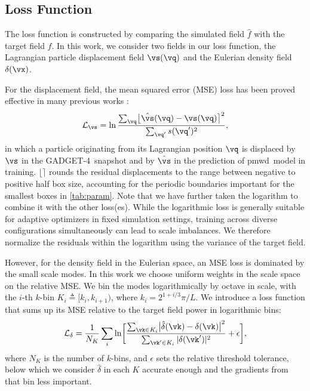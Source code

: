 \documentclass[modern, trackchanges, dvipsnames]{aastex631}
\newcommand{\pmwd}{{\usefont{T1}{nova}{m}{sl}pmwd}}
\newcommand{\GADGET}{{{\fontsize{10pt}{12pt}\selectfont GADGET}-4}}
\newcommand{\cL}{\mathcal{L}}
\begin{document}
\vspace{1em}
\subsection{Loss Function}
\label{sec:loss}

The loss function is constructed by comparing the simulated field $\hat
f$ with the target field $f$.
In this work, we consider two fields in our loss function, the
Lagrangian particle displacement field $\vs(\vq)$ and the Eulerian
density field $\delta(\vx)$.

For the displacement field, the mean squared error (MSE) loss has been
proved effective in many previous works
\citep[e.g.,][]{HeEtAl2019, LiEtAl2021}:
%
\begin{equation}
\cL_\vs = \ln \frac{\sum_\vq \bigl\lfloor \hat\vs(\vq) - \vs(\vq) \bigr\rceil^2}
                   {\sum_{\vq'} s(\vq')^2},
\end{equation}
%
in which a particle originating from its Lagrangian position $\vq$ is
displaced by $\vs$ in the \GADGET\ snapshot and by $\hat\vs$ in the
prediction of \pmwd\ model in training.
$\lfloor\rceil$ rounds the residual displacements to the range between
negative to positive half box size, accounting for the periodic
boundaries important for the smallest boxes in \autoref{tab:param}.
Note that we have further taken the logarithm to combine it with the
other loss(es).
While the logarithmic loss is generally suitable for adaptive optimizers in
fixed simulation settings, training across diverse configurations simultaneously
can lead to scale imbalances.
We therefore normalize the residuals within the logarithm using the variance of
the target field.

However, for the density field in the Eulerian space, an MSE loss is
dominated by the small scale modes.
In this work we choose uniform weights in the scale space on the
relative MSE.
We bin the modes logarithmically by  octave in scale, with
the $i$-th $k$-bin $K_i \triangleq [k_i, k_{i+1})$, where $k_i =
2^{1+i/3} \pi / L$.
We introduce a loss function that sums up its MSE relative to the target
field power in logarithmic bins:
%
\begin{equation}
  \cL_\delta = \frac1{N_K} \sum_i \ln \biggl[
  \frac{\sum_{\vk \in K_i} \bigl| \hat \delta(\vk) - \delta(\vk) \bigr|^2}
       {\sum_{\vk' \in K_i} | \delta(\vk')|^2} + \epsilon \biggr],
\label{loss_power_ln}
\end{equation}
%
where $N_K$ is the number of $k$-bins, and $\epsilon$ sets the relative
threshold tolerance, below which we consider $\hat \delta$ in each $K$
accurate enough and the gradients from that bin less important.
\end{document}
